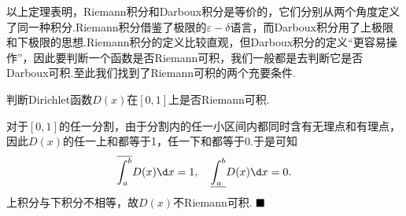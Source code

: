 以上定理表明，Riemann积分和Darboux积分是等价的，它们分别从两个角度定义了同一种积分.Riemann积分借鉴了极限的$\varepsilon-\delta$语言，而Darboux积分用了上极限和下极限的思想.Riemann积分的定义比较直观，但Darboux积分的定义“更容易操作”，因此要判断一个函数是否Riemann可积，我们一般都是去判断它是否Darboux可积.至此我们找到了Riemann可积的两个充要条件.
\begin{example}
	判断Dirichlet函数$D(x)$在$\left[0,1\right]$上是否Riemann可积.
\end{example}
\begin{solution}
	对于$\left[0,1\right]$的任一分割，由于分割内的任一小区间内都同时含有无理点和有理点，因此$D(x)$的任一上和都等于1，任一下和都等于0.于是可知
	$$\overline{\int_{a}^{b}}D(x)\d x=1,\quad \underline{\int_{a}^{b}}D(x)\d x=0.$$
	上积分与下积分不相等，故$D(x)$不Riemann可积.
	$\hfill\blacksquare$
\end{solution}
